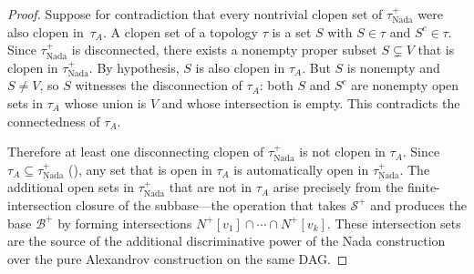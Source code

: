 \documentclass[11pt,a4paper]{article}
\theoremstyle{plain}
\theoremstyle{definition}
\newcommand{\Nfwd}[1]{N^{+}[#1]}
\newcommand{\taufwd}{\tau^{+}}
\newcommand{\subbase}{\mathcal{S}}
\newcommand{\base}{\mathcal{B}}
\begin{document}
\begin{proof}
Suppose for contradiction that every nontrivial clopen set of
$\taufwd_{\mathrm{Nada}}$ were also clopen in~$\tau_A$.  A clopen set of a
topology $\tau$ is a set $S$ with $S \in \tau$ and $S^c \in \tau$.  Since
$\taufwd_{\mathrm{Nada}}$ is disconnected, there exists a nonempty proper
subset $S \subsetneq V$ that is clopen in $\taufwd_{\mathrm{Nada}}$.  By
hypothesis, $S$ is also clopen in $\tau_A$.  But $S$ is nonempty and
$S \neq V$, so $S$ witnesses the disconnection of $\tau_A$: both $S$ and
$S^c$ are nonempty open sets in $\tau_A$ whose union is $V$ and whose
intersection is empty.  This contradicts the connectedness of $\tau_A$.

Therefore at least one disconnecting clopen of $\taufwd_{\mathrm{Nada}}$ is
not clopen in $\tau_A$.  Since $\tau_A \subseteq \taufwd_{\mathrm{Nada}}$
(), any set that is open in $\tau_A$ is
automatically open in $\taufwd_{\mathrm{Nada}}$.  The additional open sets in
$\taufwd_{\mathrm{Nada}}$ that are not in $\tau_A$ arise precisely from the
finite-intersection closure of the subbase---the operation that takes
$\subbase^{+}$ and produces the base $\base^{+}$ by forming intersections
$\Nfwd{v_1} \cap \cdots \cap \Nfwd{v_k}$.  These intersection sets are the
source of the additional discriminative power of the Nada construction over
the pure Alexandrov construction on the same DAG.
\end{proof}

\end{document}

